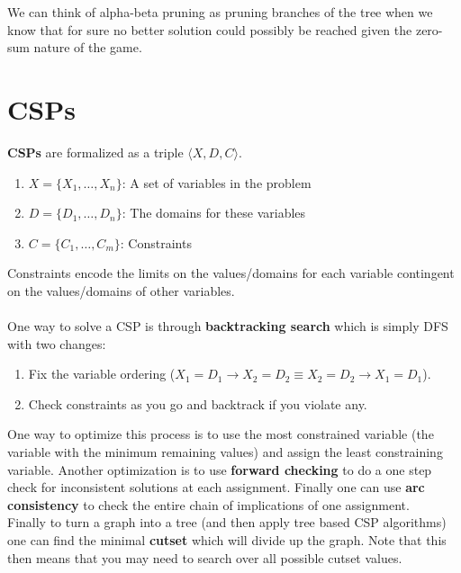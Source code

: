 \documentclass[a4paper]{article}
\begin{document}
We can think of alpha-beta pruning as pruning branches of the tree when we know that for sure no better solution could possibly be reached given the zero-sum nature of the game.

\section*{CSPs}
\noindent \textbf{CSPs} are formalized as a triple $\langle X,D,C \rangle$. 
\begin{enumerate}
\item $X = \{X_1, \ldots, X_n\}$: A set of variables in the problem
\item $D = \{D_1, \ldots, D_n\}$: The domains for these variables
\item $C = \{C_1, \ldots, C_m\}$: Constraints
\end{enumerate}
Constraints encode the limits on the values/domains for each variable contingent on the values/domains of other variables.
\\ \\
\noindent One way to solve a CSP is through \textbf{backtracking search} which is simply DFS with two changes:
\begin{enumerate}
\item Fix the variable ordering ($X_1 = D_1 \rightarrow X_2 = D_2 \equiv X_2 = D_2 \rightarrow X_1 = D_1$).
\item Check constraints as you go and backtrack if you violate any.
\end{enumerate}
One way to optimize this process is to use the most constrained variable (the variable with the minimum remaining values) and assign the least constraining variable. Another optimization is to use \textbf{forward checking} to do a one step check for inconsistent solutions at each assignment. Finally one can use \textbf{arc consistency} to check the entire chain of implications of one assignment.\\

Finally to turn a graph into a tree (and then apply tree based CSP algorithms) one can find the minimal \textbf{cutset} which will divide up the graph. Note that this then means that you may need to search over all possible cutset values.

\newpage
\end{document}
